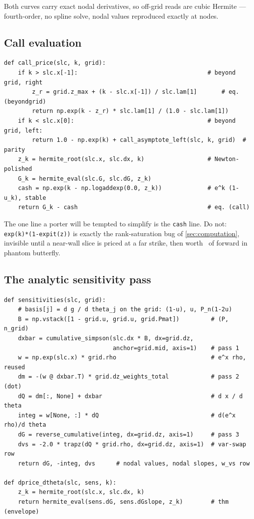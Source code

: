 Both curves carry exact nodal derivatives, so off-grid reads are cubic
Hermite --- fourth-order, no spline solve, nodal values reproduced
exactly at nodes.

\subsection{Call evaluation}

\begin{lstlisting}[caption={Pricing one strike: two ledger entries, the
cash leg in log space, and the beyond-grid asymptote.}]
def call_price(slc, k, grid):
    if k > slc.x[-1]:                                     # beyond grid, right
        z_r = grid.z_max + (k - slc.x[-1]) / slc.lam[1]       # eq. (beyondgrid)
        return np.exp(k - z_r) * slc.lam[1] / (1.0 - slc.lam[1])
    if k < slc.x[0]:                                      # beyond grid, left:
        return 1.0 - np.exp(k) + call_asymptote_left(slc, k, grid)  # parity
    z_k = hermite_root(slc.x, slc.dx, k)                  # Newton-polished
    G_k = hermite_eval(slc.G, slc.dG, z_k)
    cash = np.exp(k - np.logaddexp(0.0, z_k))             # e^k (1-u_k), stable
    return G_k - cash                                     # eq. (call)
\end{lstlisting}

The one line a porter will be tempted to simplify is the \texttt{cash}
line.  Do not: \texttt{exp(k)*(1-expit(z))} is exactly the rank-saturation
bug of \cref{sec:computation}, invisible until a near-wall slice is
priced at a far strike, then worth \MacAuditPreFixFly\ of forward in
phantom butterfly.

\subsection{The analytic sensitivity pass}

\begin{lstlisting}[caption={All Jacobian columns in one pass over the
build's arrays; eqs.\ (pass1)--(pass3) and (varswaprow).}]
def sensitivities(slc, grid):
    # basis[j] = d g / d theta_j on the grid: (1-u), u, P_n(1-2u)
    B = np.vstack([1 - grid.u, grid.u, grid.Pmat])         # (P, n_grid)
    dxbar = cumulative_simpson(slc.dx * B, dx=grid.dz,
                               anchor=grid.mid, axis=1)    # pass 1
    w = np.exp(slc.x) * grid.rho                           # e^x rho, reused
    dm = -(w @ dxbar.T) * grid.dz_weights_total            # pass 2 (dot)
    dQ = dm[:, None] + dxbar                               # d x / d theta
    integ = w[None, :] * dQ                                # d(e^x rho)/d theta
    dG = reverse_cumulative(integ, dx=grid.dz, axis=1)     # pass 3
    dvs = -2.0 * trapz(dQ * grid.rho, dx=grid.dz, axis=1)  # var-swap row
    return dG, -integ, dvs      # nodal values, nodal slopes, w_vs row

def dprice_dtheta(slc, sens, k):
    z_k = hermite_root(slc.x, slc.dx, k)
    return hermite_eval(sens.dG, sens.dGslope, z_k)        # thm (envelope)
\end{lstlisting}

